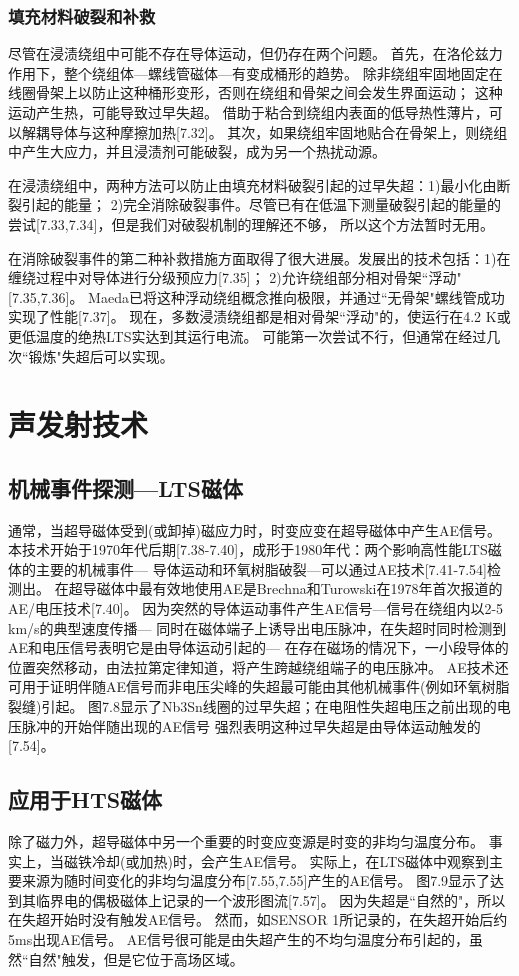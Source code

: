 \subsubsection*{填充材料破裂和补救}
尽管在浸渍绕组中可能不存在导体运动，但仍存在两个问题。
首先，在洛伦兹力作用下，整个绕组体---螺线管磁体---有变成桶形的趋势。
除非绕组牢固地固定在线圈骨架上以防止这种桶形变形，否则在绕组和骨架之间会发生界面运动；
这种运动产生热，可能导致过早失超。
借助于粘合到绕组内表面的低导热性薄片，可以解耦导体与这种摩擦加热[7.32]。
其次，如果绕组牢固地贴合在骨架上，则绕组中产生大应力，并且浸渍剂可能破裂，成为另一个热扰动源。

在浸渍绕组中，两种方法可以防止由填充材料破裂引起的过早失超：1)最小化由断裂引起的能量；
2)完全消除破裂事件。尽管已有在低温下测量破裂引起的能量的尝试[7.33,7.34]，但是我们对破裂机制的理解还不够，
所以这个方法暂时无用。

在消除破裂事件的第二种补救措施方面取得了很大进展。发展出的技术包括：1)在缠绕过程中对导体进行分级预应力[7.35]；
2)允许绕组部分相对骨架``浮动"[7.35,7.36]。
 Maeda已将这种浮动绕组概念推向极限，并通过``无骨架"螺线管成功实现了性能[7.37]。
 现在，多数浸渍绕组都是相对骨架``浮动"的，使运行在4.2 K或更低温度的绝热LTS实达到其运行电流。
 可能第一次尝试不行，但通常在经过几次``锻炼"失超后可以实现。


\section{声发射技术}
\subsection{机械事件探测---LTS磁体}
通常，当超导磁体受到(或卸掉)磁应力时，时变应变在超导磁体中产生AE信号。
本技术开始于1970年代后期[7.38-7.40]，成形于1980年代：两个影响高性能LTS磁体的主要的机械事件---
导体运动和环氧树脂破裂---可以通过AE技术[7.41-7.54]检测出。
在超导磁体中最有效地使用AE是Brechna和Turowski在1978年首次报道的AE/电压技术[7.40]。
因为突然的导体运动事件产生AE信号---信号在绕组内以2-5 km/s的典型速度传播---
同时在磁体端子上诱导出电压脉冲，在失超时同时检测到AE和电压信号表明它是由导体运动引起的---
在存在磁场的情况下，一小段导体的位置突然移动，由法拉第定律知道，将产生跨越绕组端子的电压脉冲。 
AE技术还可用于证明伴随AE信号而非电压尖峰的失超最可能由其他机械事件(例如环氧树脂裂缝)引起。
图7.8显示了Nb3Sn线圈的过早失超；在电阻性失超电压之前出现的电压脉冲的开始伴随出现的AE信号
强烈表明这种过早失超是由导体运动触发的[7.54]。

\subsection{应用于HTS磁体}
除了磁力外，超导磁体中另一个重要的时变应变源是时变的非均匀温度分布。
事实上，当磁铁冷却(或加热)时，会产生AE信号。
实际上，在LTS磁体中观察到主要来源为随时间变化的非均匀温度分布[7.55,7.55]产生的AE信号。
图7.9显示了达到其临界电的偶极磁体上记录的一个波形图流[7.57]。
因为失超是``自然的"，所以在失超开始时没有触发AE信号。
然而，如SENSOR 1所记录的，在失超开始后约5ms出现AE信号。
AE信号很可能是由失超产生的不均匀温度分布引起的，虽然``自然"触发，但是它位于高场区域。

